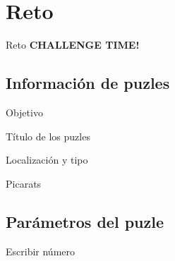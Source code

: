 \section{Reto}
\begin{frame}{Reto}
    \Huge\centering\textbf{CHALLENGE TIME!}
\end{frame}

\subsection{Información de puzles}
\begin{frame}{Objetivo}
\end{frame}

\begin{frame}{Título de los puzles}
\end{frame}

\begin{frame}{Localización y tipo}
\end{frame}

\begin{frame}{Picarats}
\end{frame}

\subsection{Parámetros del puzle}
\begin{frame}{Escribir número}
\end{frame}

